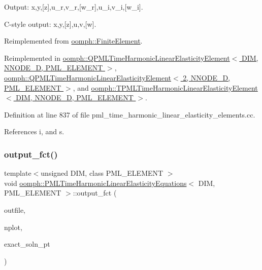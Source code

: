 Output\+: x,y,\mbox{[}z\mbox{]},u\+\_\+r,v\+\_\+r,\mbox{[}w\+\_\+r\mbox{]},u\+\_\+i,v\+\_\+i,\mbox{[}w\+\_\+i\mbox{]}. 

C-\/style output\+: x,y,\mbox{[}z\mbox{]},u,v,\mbox{[}w\mbox{]}. 

Reimplemented from \hyperlink{classoomph_1_1FiniteElement_adfaee690bb0608f03320eeb9d110d48c}{oomph\+::\+Finite\+Element}.



Reimplemented in \hyperlink{classoomph_1_1QPMLTimeHarmonicLinearElasticityElement_a0065cae9f58583e0354aa00cbe6122af}{oomph\+::\+Q\+P\+M\+L\+Time\+Harmonic\+Linear\+Elasticity\+Element$<$ D\+I\+M, N\+N\+O\+D\+E\+\_\+D, P\+M\+L\+\_\+\+E\+L\+E\+M\+E\+N\+T $>$}, \hyperlink{classoomph_1_1QPMLTimeHarmonicLinearElasticityElement_a0065cae9f58583e0354aa00cbe6122af}{oomph\+::\+Q\+P\+M\+L\+Time\+Harmonic\+Linear\+Elasticity\+Element$<$ 2, N\+N\+O\+D\+E\+\_\+D, P\+M\+L\+\_\+\+E\+L\+E\+M\+E\+N\+T $>$}, and \hyperlink{classoomph_1_1TPMLTimeHarmonicLinearElasticityElement_a5edb532350fa452e91da31a872f21eac}{oomph\+::\+T\+P\+M\+L\+Time\+Harmonic\+Linear\+Elasticity\+Element$<$ D\+I\+M, N\+N\+O\+D\+E\+\_\+D, P\+M\+L\+\_\+\+E\+L\+E\+M\+E\+N\+T $>$}.



Definition at line 837 of file pml\+\_\+time\+\_\+harmonic\+\_\+linear\+\_\+elasticity\+\_\+elements.\+cc.



References i, and s.

\mbox{\label{classoomph_1_1PMLTimeHarmonicLinearElasticityEquations_ae0be2b91337f92f2a65536446a050609}} 
\subsubsection{\texorpdfstring{output\+\_\+fct()}{output\_fct()}}
{\footnotesize\ttfamily template$<$unsigned D\+IM, class P\+M\+L\+\_\+\+E\+L\+E\+M\+E\+NT $>$ \\
void \hyperlink{classoomph_1_1PMLTimeHarmonicLinearElasticityEquations}{oomph\+::\+P\+M\+L\+Time\+Harmonic\+Linear\+Elasticity\+Equations}$<$ D\+IM, P\+M\+L\+\_\+\+E\+L\+E\+M\+E\+NT $>$\+::output\+\_\+fct (\begin{DoxyParamCaption}\item[{std\+::ostream \&}]{outfile,  }\item[{const unsigned \&}]{nplot,  }\item[{\hyperlink{classoomph_1_1FiniteElement_a690fd33af26cc3e84f39bba6d5a85202}{Finite\+Element\+::\+Steady\+Exact\+Solution\+Fct\+Pt}}]{exact\+\_\+soln\+\_\+pt }\end{DoxyParamCaption})\hspace{0.3cm}{\ttfamily [virtual]}}



